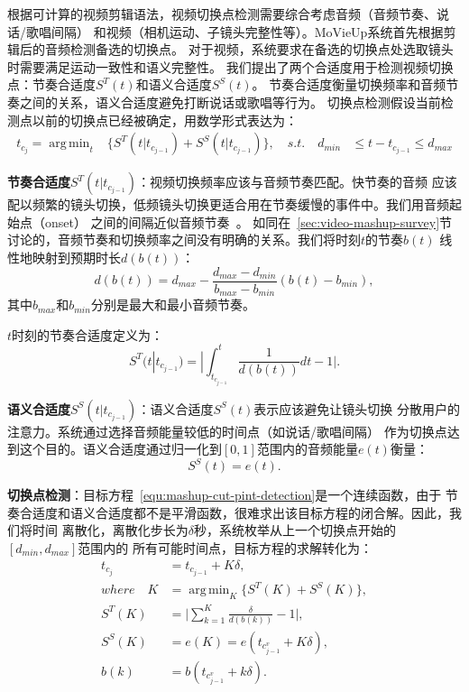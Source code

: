 \documentclass[doctor]{ustcthesis}
\DeclareMathOperator*{\argmin}{arg\,min}
\begin{document}
根据可计算的视频剪辑语法，视频切换点检测需要综合考虑音频（音频节奏、说话/歌唱间隔）
和视频（相机运动、子镜头完整性等）。MoVieUp系统首先根据剪辑后的音频检测备选的切换点。
对于视频，系统要求在备选的切换点处选取镜头时需要满足运动一致性和语义完整性。
我们提出了两个合适度用于检测视频切换点：节奏合适度$S^T(t)$和语义合适度$S^S(t)$。
节奏合适度衡量切换频率和音频节奏之间的关系，语义合适度避免打断说话或歌唱等行为。
切换点检测假设当前检测点以前的切换点已经被确定，用数学形式表达为：
\begin{equation}
    \begin{aligned}
        t_{c_j} = \argmin_{t}&\big\{{S^T(t|t_{c_{j-1}}) +
        S^S(t|t_{c_{j-1}})}\big\}, \quad s.t. \quad
        d_{min} &\leq t - t_{c_{j-1}} \leq d_{max}
    \end{aligned}
    \label{equ:mashup-cut-pint-detection}
\end{equation}

\textbf{节奏合适度$S^T(t|t_{c_{j-1}})$}：视频切换频率应该与音频节奏匹配。快节奏的音频
应该配以频繁的镜头切换，低频镜头切换更适合用在节奏缓慢的事件中。我们用音频起始点（onset）
之间的间隔近似音频节奏~\cite{DBLP:conf/mm/HuaLZ03,stowell2007adaptive}。
如同在~\ref{sec:video-mashup-survey}节讨论的，音频节奏和切换频率之间没有明确的关系。我们将时刻$t$的节奏$b(t)$
线性地映射到预期时长$d(b(t))$：
\begin{equation}
    d(b(t)) = d_{max} - \frac{d_{max} - d_{min}}{b_{max} - b_{min}} (b(t) - b_{min}),
\end{equation}
其中$b_{max}$和$b_{min}$分别是最大和最小音频节奏。

$t$时刻的节奏合适度定义为：
\begin{equation}
    S^T(t|t_{c_{j-1}}) = |\int_{t_{c_{j-1}}}^{t}{\frac{1}{d(b(t))}dt} - 1|.
\end{equation}

\textbf{语义合适度$S^S(t|t_{c_{j-1}})$}：语义合适度$S^S(t)$表示应该避免让镜头切换
分散用户的注意力。系统通过选择音频能量较低的时间点（如说话/歌唱间隔）
作为切换点达到这个目的。语义合适度通过归一化到$[0,1]$范围内的音频能量$e(t)$衡量：
\begin{equation}
    S^S(t) = e(t).
\end{equation}

\textbf{切换点检测}：目标方程~\eqref{equ:mashup-cut-pint-detection}是一个连续函数，由于
节奏合适度和语义合适度都不是平滑函数，很难求出该目标方程的闭合解。因此，我们将时间
离散化，离散化步长为$\delta$秒，系统枚举从上一个切换点开始的$[d_{min},d_{max}]$范围内的
所有可能时间点，目标方程的求解转化为：
\begin{equation}
    \begin{aligned}
        t_{c_j}   &= t_{c_{j-1}} + K\delta, \\
        where \quad K &= \argmin_{K}\big\{S^T(K) + S^S(K)\big\},\\
        S^T(K)  &= \big|\sum_{k=1}^K{\frac{\delta}{d(b(k))}} - 1\big|, \\
        S^S(K)  &= e(K)= e(t_{c_{j-1}^v}  + K\delta), \\
        b(k)    &= b(t_{c_{j-1}^v}  + k\delta).\\
    \end{aligned}
\end{equation}
\end{document}
